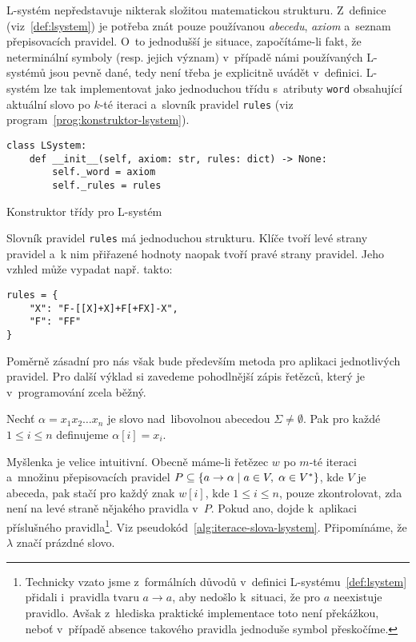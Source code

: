 L-systém nepředstavuje nikterak složitou matematickou strukturu. Z~definice (viz~\ref{def:lsystem}) je potřeba znát pouze používanou \emph{abecedu}, \emph{axiom} a~seznam přepisovacích pravidel. O~to jednodušší je situace, započítáme-li fakt, že neterminální symboly (resp. jejich význam) v~případě námi používaných L-systémů jsou pevně dané, tedy není třeba je explicitně uvádět v~definici. L-systém lze tak implementovat jako jednoduchou třídu s~atributy \texttt{word} obsahující aktuální slovo po $k$-té iteraci a~slovník pravidel \texttt{rules} (viz program~\ref{prog:konstruktor-lsystem}).
\begin{program}[h]
    \begin{lstlisting}[style=python]
class LSystem:
    def __init__(self, axiom: str, rules: dict) -> None:
        self._word = axiom
        self._rules = rules
\end{lstlisting}
    \caption{Konstruktor třídy pro L-systém}
    \label{prog:konstruktor-lsystem}
\end{program}
Slovník pravidel \texttt{rules} má jednoduchou strukturu. Klíče tvoří levé strany pravidel a~k nim přiřazené hodnoty naopak tvoří pravé strany pravidel. Jeho vzhled může vypadat např. takto:
\begin{verbatim}
rules = {
    "X": "F-[[X]+X]+F[+FX]-X",
    "F": "FF"
}
\end{verbatim}
Poměrně zásadní pro nás však bude především metoda pro aplikaci jednotlivých pravidel. Pro další výklad si zavedeme pohodlnější zápis řetězců, který je v~programování zcela běžný.
\begin{definition}\label{def:index-retezce}
    Nechť $\alpha=x_1x_2\ldots x_n$ je slovo nad~libovolnou abecedou $\Sigma\neq\emptyset$. Pak pro každé $1\leqslant i\leqslant n$ definujeme $\alpha[i]=x_i$.
\end{definition}
Myšlenka je velice intuitivní. Obecně máme-li řetězec $w$ po $m$-té iteraci a~množinu přepisovacích pravidel $P\subseteq\left\{a\to\alpha\mid a\in V,\;\alpha\in V^*\right\}$, kde $V$ je abeceda, pak stačí pro každý znak $w[i]$, kde $1\leqslant i\leqslant n$, pouze zkontrolovat, zda není na levé straně nějakého pravidla v~$P$. Pokud ano, dojde k~aplikaci příslušného pravidla\footnote{Technicky vzato jsme z~formálních důvodů v~definici L-systému~\ref{def:lsystem} přidali i~pravidla tvaru $a\to a$, aby nedošlo k~situaci, že pro $a$ neexistuje pravidlo. Avšak z~hlediska praktické implementace toto není překážkou, neboť v~případě absence takového pravidla jednoduše symbol přeskočíme.}. Viz pseudokód~\ref{alg:iterace-slova-lsystem}. Připomínáme, že $\lambda$ značí prázdné slovo.
